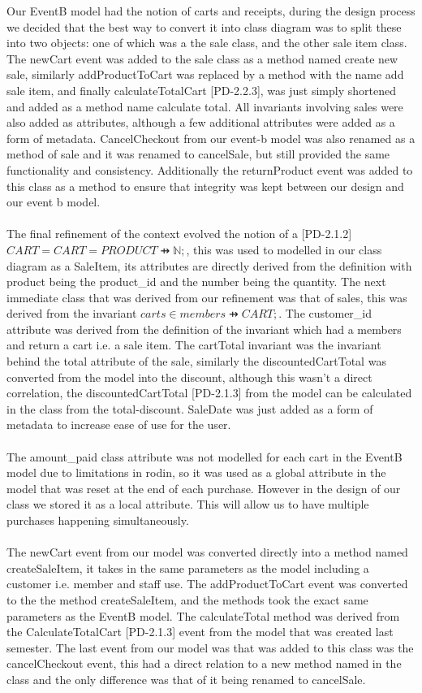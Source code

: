 \documentclass[a4paper]{article}
\begin{document}
Our EventB model had the notion of carts and receipts, during the design process we decided that the best way to convert it into class diagram was to split these into two objects: one of which was a the sale class, and the other sale item class. The newCart event was added to the sale class as a method named create new sale, similarly addProductToCart was replaced by a method with the name add sale item, and finally calculateTotalCart [PD-2.2.3], was just simply shortened and added as a method name calculate total. All invariants involving sales were also added as attributes, although a few additional attributes were added as a form of metadata. CancelCheckout from our event-b model was also renamed as a method of sale and it was renamed to cancelSale, but still provided the same functionality and consistency. Additionally the returnProduct  event was added to this class as a method to ensure that integrity was kept between our design and our event b model.
\\\\
The final refinement of the context evolved the notion of a [PD-2.1.2] \(CART = CART = PRODUCT ⇸ \mathbb{N}; \), this was used to modelled in our class diagram as a SaleItem, its attributes are directly derived from the definition with product being the product\_id and the number being the quantity. The next immediate class that was derived from our refinement was that of sales, this was derived from the invariant \(carts \in members ⇸ CART; \). The customer\_id attribute was derived from the definition of the invariant which had a members and return a cart i.e. a sale item. The cartTotal invariant  was the invariant behind the total attribute of the sale, similarly the discountedCartTotal  was converted from the model into the discount, although this wasn't a direct correlation, the discountedCartTotal [PD-2.1.3] from the model can be calculated in the class from the total-discount. SaleDate was just added as a form of metadata to increase ease of use  for the user. 
\\\\
The amount\_paid class attribute was not modelled for each cart in the EventB model due to limitations in rodin, so it was used as a global attribute in the model that was reset at the end of each purchase. However in the design of our class we stored it as a local attribute. This will allow us to have multiple purchases happening simultaneously.
\\\\
The newCart event from our model was converted directly into a method named createSaleItem, it takes in the same parameters as the model including a customer i.e. member and staff use. The addProductToCart event was converted to the the method createSaleItem, and the methods took the exact same parameters as the EventB model. The calculateTotal method was derived from the CalculateTotalCart [PD-2.1.3] event from the model that was created last semester.  The last event from our model was that was added to this class was the cancelCheckout event, this had a direct relation to a new method named in the class and the only difference was that of it being renamed to cancelSale.
\end{document}
